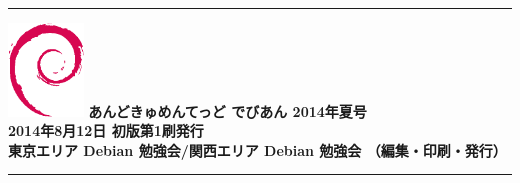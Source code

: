 \documentclass[mingoth,a4paper]{jsarticle}
\begin{document}
\vspace*{13cm}
{\color{dancerlightblue}\rule{\hsize}{1mm}}
\vspace{2mm}
\includegraphics[width=2cm]{image200502/openlogo-nd.eps}
\noindent \Large \bf あんどきゅめんてっど でびあん 2014年夏号\\
\noindent \normalfont 2014年8月12日 \hspace{5mm}  初版第1刷発行\\
\noindent \normalfont 東京エリア Debian 勉強会/関西エリア Debian 勉強会 （編集・印刷・発行）\\
{\color{dancerdarkblue}\rule{\hsize}{1mm}}
\end{document}
